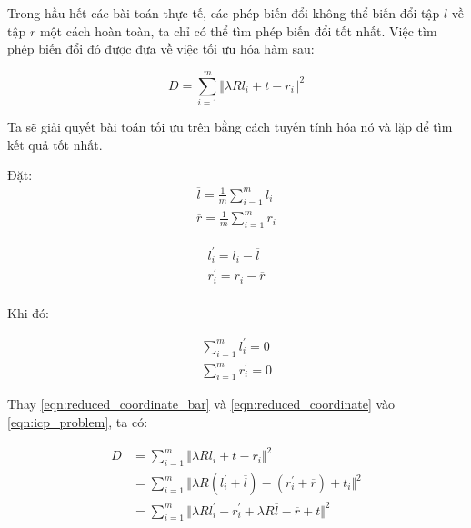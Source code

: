 \documentclass[../../main.tex]{subfiles}
\begin{document}
Trong hầu hết các bài toán thực tế, các phép biến đổi không thể biến đổi tập $l$ về tập $r$ một cách hoàn toàn, ta chỉ có thể tìm phép biến đổi tốt nhất. Việc tìm phép biến đổi đó được đưa về việc tối ưu hóa hàm sau:

\begin{equation}
    D = \sum_{i = 1}^{m} \Vert \lambda R l_i + t - r_i\Vert ^2
    \label{eqn:icp_problem}
\end{equation}

Ta sẽ giải quyết bài toán tối ưu trên bằng cách tuyến tính hóa nó và lặp để tìm kết quả tốt nhất.

Đặt:
\begin{equation}
\begin{split}
    \overline{l} = \frac{1}{m}\sum_{i = 1}^{m} l_i \\
    \overline{r} = \frac{1}{m}\sum_{i = 1}^{m} r_i  
\end{split}
\label{eqn:reduced_coordinate_bar}
\end{equation}

\begin{equation}
\begin{split}
    l^{\prime}_i = l_i - \overline{l} \\
    r^{\prime}_i = r_i - \overline{r} \\
\end{split}
\label{eqn:reduced_coordinate}
\end{equation}

Khi đó:

\begin{equation}
    \begin{split}
        \sum_{i = 1}^{m} l^{\prime}_i = 0 \\
        \sum_{i = 1}^{m} r^{\prime}_i = 0 
    \end{split}
    \label{eqn:reduced_coordinate_condition}
\end{equation}

Thay \ref{eqn:reduced_coordinate_bar} và \ref{eqn:reduced_coordinate}
 vào \ref{eqn:icp_problem}, ta có:

\begin{equation}
\begin{split}
    D &= \sum_{i = 1}^{m} \Vert \lambda R l_i + t - r_i \Vert ^2 \\
      &= \sum_{i = 1}^{m} \Vert \lambda R (l^{\prime}_i + \overline{l}) - (r^{\prime}_i + \overline{r}) + t_i \Vert ^2 \\
      &= \sum_{i = 1}^{m} \Vert \lambda R l^{\prime}_i - r^{\prime}_i + \lambda R \overline{l} - \overline{r} + t \Vert ^2 \\
\end{split}
\end{equation}
\end{document}
